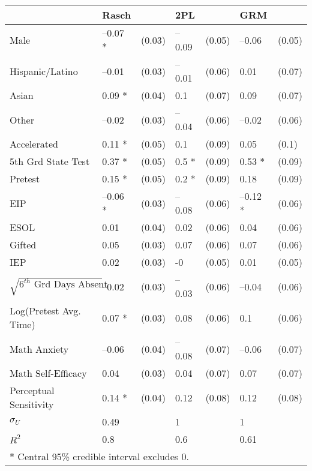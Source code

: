 \begin{tabular}{lllllll}
  \hline
  & Rasch &  & 2PL &  & GRM &  \\ 
   \hline
Male & --0.07 * & (0.03) & --0.09 & (0.05) & --0.06 & (0.05) \\ 
  Hispanic/Latino & --0.01 & (0.03) & --0.01 & (0.06) & 0.01 & (0.07) \\ 
  Asian & 0.09 * & (0.04) & 0.1 & (0.07) & 0.09 & (0.07) \\ 
  Other & --0.02 & (0.03) & --0.04 & (0.06) & --0.02 & (0.06) \\ 
  Accelerated & 0.11 * & (0.05) & 0.1 & (0.09) & 0.05 & (0.1) \\ 
  5th Grd State Test & 0.37 * & (0.05) & 0.5 * & (0.09) & 0.53 * & (0.09) \\ 
  Pretest & 0.15 * & (0.05) & 0.2 * & (0.09) & 0.18 & (0.09) \\ 
  EIP & --0.06 * & (0.03) & --0.08 & (0.06) & --0.12 * & (0.06) \\ 
  ESOL & 0.01 & (0.04) & 0.02 & (0.06) & 0.04 & (0.06) \\ 
  Gifted & 0.05 & (0.03) & 0.07 & (0.06) & 0.07 & (0.06) \\ 
  IEP & 0.02 & (0.03) & -0 & (0.05) & 0.01 & (0.05) \\ 
  $\sqrt{6^{th}\mbox{ Grd Days Absent}}$ & --0.02 & (0.03) & --0.03 & (0.06) & --0.04 & (0.06) \\ 
  Log(Pretest Avg. Time) & 0.07 * & (0.03) & 0.08 & (0.06) & 0.1 & (0.06) \\ 
  Math Anxiety & --0.06 & (0.04) & --0.08 & (0.07) & --0.06 & (0.07) \\ 
  Math Self-Efficacy & 0.04 & (0.03) & 0.04 & (0.07) & 0.07 & (0.07) \\ 
  Perceptual Sensitivity & 0.14 * & (0.04) & 0.12 & (0.08) & 0.12 & (0.08) \\ 
   \hline
$\sigma_U$ & 0.49 &  & 1 &  & 1 &  \\ 
  $R^2$ & 0.8 &  & 0.6 &  & 0.61 &  \\ 
   \hline
\multicolumn{7}{l}{* Central 95\% credible interval excludes 0.} &  &  &  &  &  &  \\ 
  \end{tabular}

